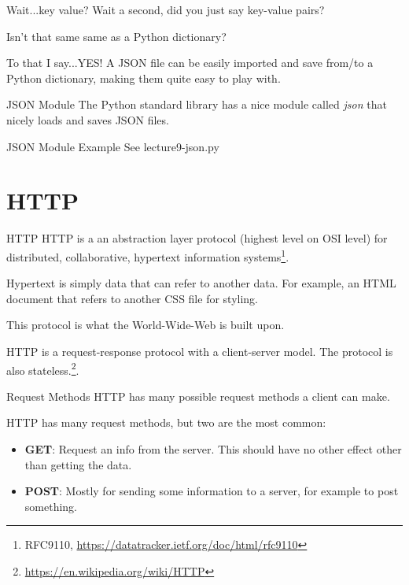 \begin{frame}{Wait...key value?}
  Wait a second, did you just say key-value pairs?\pause

  Isn't that same same as a Python dictionary?\pause

  To that I say...YES!
  A JSON file can be easily imported and save from/to a Python dictionary, making them quite easy to play with.
\end{frame}

\begin{frame}{JSON Module}
  The Python standard library has a nice module called \textit{json} that nicely loads and saves JSON files.
\end{frame}

\begin{frame}{JSON Module Example}
See lecture9-json.py
\end{frame}

\section{HTTP}

\begin{frame}{HTTP}
  HTTP is a an abstraction layer protocol (highest level on OSI level) for distributed, collaborative, hypertext information systems\footnote{RFC9110, \url{https://datatracker.ietf.org/doc/html/rfc9110}}.

  Hypertext is simply data that can refer to another data. For example, an HTML document that refers to another CSS file for styling.

  This protocol is what the World-Wide-Web is built upon.

  HTTP is a request-response protocol with a client-server model. The protocol is also stateless.\footnote{\url{https://en.wikipedia.org/wiki/HTTP}}.
\end{frame}

\begin{frame}{Request Methods}
  HTTP has many possible request methods a client can make.

  HTTP has many request methods, but two are the most common:
  \begin{itemize}
    \item \textbf{GET}: Request an info from the server. This should have no other effect other than getting the data.
    \item \textbf{POST}: Mostly for sending some information to a server, for example to post something.
  \end{itemize}
\end{frame}

